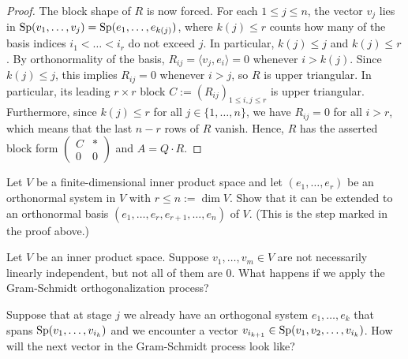 \begin{proof}
The block shape of $R$ is now forced. For each $1 \le j \le n$, the vector $v_j$ lies in $\operatorname{Sp}(v_1, \dots, v_j) = \operatorname{Sp}(e_1, \dots, e_{k(j)})$, where $k(j) \le r$ counts how many of the basis indices $i_1 < \dots < i_r$ do not exceed $j$. In particular, $k(j) \le j$ and $k(j) \le r$. By orthonormality of the basis, $R_{ij} = \langle v_j, e_i \rangle = 0$ whenever $i > k(j)$. Since $k(j) \le j$, this implies $R_{ij} = 0$ whenever $i > j$, so $R$ is upper triangular. In particular, its leading $r \times r$ block $C := (R_{ij})_{1 \le i, j \le r}$ is upper triangular. Furthermore, since $k(j) \le r$ for all $j \in \{1, \dots, n\}$, we have $R_{ij} = 0$ for all $i > r$, which means that the last $n-r$ rows of $R$ vanish. Hence, $R$ has the asserted block form $\left(\begin{array}{c|c} C & * \\ \hline 0 & 0 \end{array}\right)$ and $A = Q \cdot R$.
\end{proof}

\begin{exercise}
\label{exc:extend_orthonormal_system}
Let $V$ be a finite-di\-men\-sional inner product space and let $(e_1, \dots, e_r)$ be an orthonormal system in $V$ with $r \le n := \dim V$. Show that it can be extended to an orthonormal basis $(e_1, \dots, e_r, e_{r+1}, \dots, e_n)$ of $V$. (This is the step marked  in the proof above.)
\end{exercise}

\begin{exercise}
\label{exc:gram_schmidt_dependent}
Let $V$ be an inner product space. Suppose $v_1, \dots, v_m \in V$ are not necessarily linearly independent, but not all of them are $0$. What happens if we apply the Gram-Schmidt orthogonalization process?

Suppose that at stage $j$ we already have an orthogonal system $e_1, \dots, e_k$ that spans $\operatorname{Sp}(v_1, \dots, v_{i_k})$ and we encounter a vector $v_{i_{k+1}} \in \operatorname{Sp}(v_1, v_2, \dots, v_{i_k})$. How will the next vector in the Gram-Schmidt process look like?
\end{exercise}
